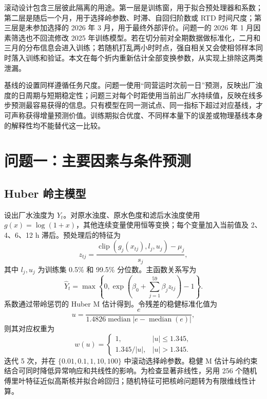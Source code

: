 \documentclass[UTF8,12pt,a4paper]{ctexart}
\begin{document}
滚动设计包含三层彼此隔离的用途。第一层是训练窗，用于拟合预处理器和系数；第二层是随后一个月，用于选择岭参数、时滞、自回归阶数或 RTD 时间尺度；第三层是未参加选择的 2026 年 3 月，用于最终外部评价。问题一的 2026 年 1 月因素筛选也不回流修改 2025 年训练模型。若在切分前对全期数据做标准化，二月和三月的分布信息会进入训练；若随机打乱两小时时点，强自相关又会使相邻样本同时落入训练和验证。本文在每个折内重新估计全部变换参数，从实现上排除这两类泄漏。

基线的设置同样遵循任务尺度。问题一使用“同营运时次前一日”预测，反映出厂浊度的日周期与短期稳定性；问题三对每个时距使用当前出厂水持续值，反映在线多步预测最容易获得的信息。只有模型在同一测试点、同一指标下超过对应基线，才可声称获得增量预测价值。训练期拟合优度、不同样本量下的误差或物理基线本身的解释性均不能替代这一比较。

\section{问题一：主要因素与条件预测}

\subsection{Huber 岭主模型}

设出厂水浊度为 $Y_t$。对原水浊度、原水色度和滤后水浊度使用 $g(x)=\log(1+x)$，其他连续变量使用恒等变换；每个变量加入当前值及 2、4、6、12 h 滞后。预处理后的特征为
\begin{equation}
z_{tj}=\frac{\operatorname{clip}(g_j(x_{tj}),l_j,u_j)-\mu_j}{s_j},
\label{eq:standardize}
\end{equation}
其中 $l_j,u_j$ 为训练集 0.5\% 和 99.5\% 分位数。主函数关系写为
\begin{equation}
\widehat Y_t=\max\left\{0,\exp\left(\beta_0+\sum_{j=1}^{59}\beta_jz_{tj}\right)-1\right\}.
\label{eq:q1function}
\end{equation}
系数通过带岭惩罚的 Huber M 估计得到。令残差的稳健标准化值为
\begin{equation}
u=\frac{e}{1.4826\operatorname{median}|e-\operatorname{median}(e)|},
\end{equation}
则其对应权重为
\begin{equation}
w(u)=\begin{cases}1,& |u|\le 1.345,\\1.345/|u|,& |u|>1.345.\end{cases}
\label{eq:huber}
\end{equation}
迭代 5 次，并在 $\{0.01,0.1,1,10,100\}$ 中滚动选择岭参数。稳健 M 估计与岭约束结合可同时降低异常响应和共线性的影响\cite{hampel1992,yasin2021}。为检查显著非线性，另用 256 个随机傅里叶特征近似高斯核并拟合岭回归；随机特征可把核岭问题转为有限维线性计算\cite{avron2017}。
\end{document}
